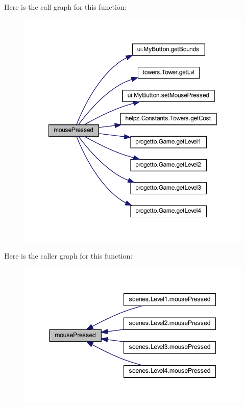 Here is the call graph for this function\+:\nopagebreak
\begin{figure}[H]
\begin{center}
\leavevmode
\includegraphics[width=350pt]{classui_1_1_action_bar_aed82e1ce3dd3cf283d508c3ba3be70ef_cgraph}
\end{center}
\end{figure}
Here is the caller graph for this function\+:\nopagebreak
\begin{figure}[H]
\begin{center}
\leavevmode
\includegraphics[width=344pt]{classui_1_1_action_bar_aed82e1ce3dd3cf283d508c3ba3be70ef_icgraph}
\end{center}
\end{figure}
\mbox{\label{classui_1_1_action_bar_a87a07291794e15052db67f945d90853e}} 
